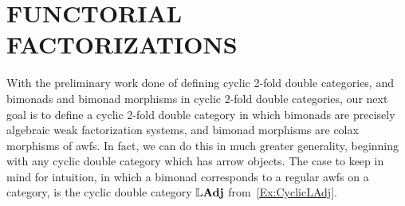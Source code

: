 
\chapter{FUNCTORIAL FACTORIZATIONS}\label{Ch:FuncFact}

With the preliminary work done of defining cyclic 2-fold double categories, and bimonads and bimonad morphisms in cyclic 2-fold double categories, our next goal is to define a cyclic 2-fold double category in which bimonads are precisely algebraic weak factorization systems, and bimonad morphisms are colax morphisms of awfs. In fact, we can do this in much greater generality, beginning with any cyclic double category which has arrow objects. The case to keep in mind for intuition, in which a bimonad corresponds to a regular awfs on a category, is the cyclic double category $\mathbb{L}\mathbf{Adj}$ from~\ref{Ex:CyclicLAdj}.

